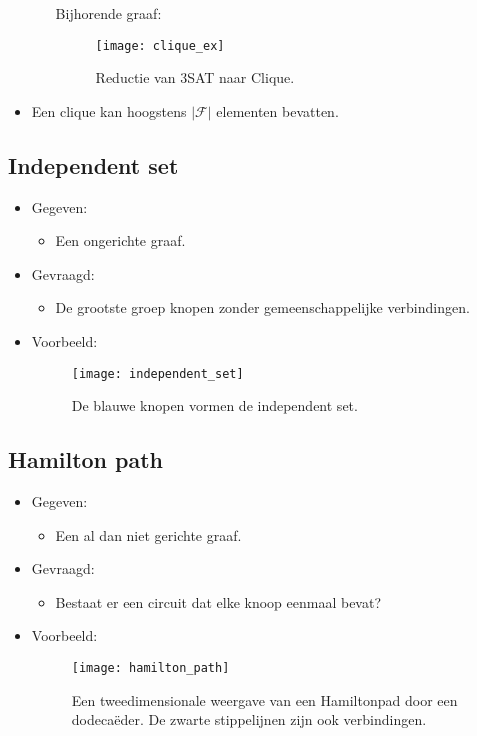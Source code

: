 \begin{itemize}
\begin{itemize}
            Bijhorende graaf:
            \begin{figure}[ht]
                \centering
                \texttt{[image: clique\_ex]}
                \caption{Reductie van 3SAT naar Clique.}
                \label{fig:clique_ex}
            \end{figure}
        \end{itemize}
        \item Een clique kan hoogstens $|\mathcal{F}|$ elementen bevatten.
    
\end{itemize}
\newpage
\subsection{Independent set}
\begin{itemize}
    \item Gegeven:
    \begin{itemize}
        \item Een ongerichte graaf.
    \end{itemize}
    \item Gevraagd:
    \begin{itemize}
        \item De grootste groep knopen zonder gemeenschappelijke verbindingen.
    \end{itemize}
    \item Voorbeeld:
    \begin{figure}[ht]
        \centering
        \texttt{[image: independent\_set]}
        \caption{De blauwe knopen vormen de independent set.}
        \label{fig:independent_set}
    \end{figure}

\end{itemize}
\newpage
\subsection{Hamilton path}
\begin{itemize}
    \item Gegeven:
    \begin{itemize}
        \item Een al dan niet gerichte graaf.
    \end{itemize}
    \item Gevraagd:
    \begin{itemize}
        \item Bestaat er een circuit dat elke knoop eenmaal bevat?
    \end{itemize}
    \item Voorbeeld:
    \begin{figure}[ht]
        \centering
        \texttt{[image: hamilton\_path]}
        \caption{Een tweedimensionale weergave van een Hamiltonpad door een dodecaëder. De zwarte stippelijnen zijn ook verbindingen.}
        \label{fig:hamilton_path}
    \end{figure}

\end{itemize}
\newpage

